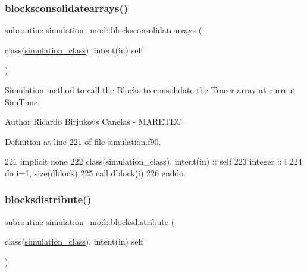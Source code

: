 \subsubsection{\texorpdfstring{blocksconsolidatearrays()}{blocksconsolidatearrays()}}
{\footnotesize\ttfamily subroutine simulation\+\_\+mod\+::blocksconsolidatearrays (\begin{DoxyParamCaption}\item[{class(\mbox{\hyperlink{structsimulation__mod_1_1simulation__class}{simulation\+\_\+class}}), intent(in)}]{self }\end{DoxyParamCaption})\hspace{0.3cm}{\ttfamily [private]}}



Simulation method to call the Blocks to consolidate the Tracer array at current Sim\+Time. 

\begin{DoxyAuthor}{Author}
Ricardo Birjukovs Canelas -\/ M\+A\+R\+E\+T\+EC 
\end{DoxyAuthor}


Definition at line 221 of file simulation.\+f90.


\begin{DoxyCode}
221     \textcolor{keywordtype}{implicit none}
222     \textcolor{keywordtype}{class}(simulation\_class), \textcolor{keywordtype}{intent(in)} :: self
223     \textcolor{keywordtype}{integer} :: i
224     \textcolor{keywordflow}{do} i=1, \textcolor{keyword}{size}(dblock)
225         \textcolor{keyword}{call }dblock(i)%
226 \textcolor{keywordflow}{    enddo}
\end{DoxyCode}
\mbox{\label{namespacesimulation__mod_a058892630af07fc0fe8a4bffec531c6a}} 
\subsubsection{\texorpdfstring{blocksdistribute()}{blocksdistribute()}}
{\footnotesize\ttfamily subroutine simulation\+\_\+mod\+::blocksdistribute (\begin{DoxyParamCaption}\item[{class(\mbox{\hyperlink{structsimulation__mod_1_1simulation__class}{simulation\+\_\+class}}), intent(in)}]{self }\end{DoxyParamCaption})\hspace{0.3cm}{\ttfamily [private]}}



